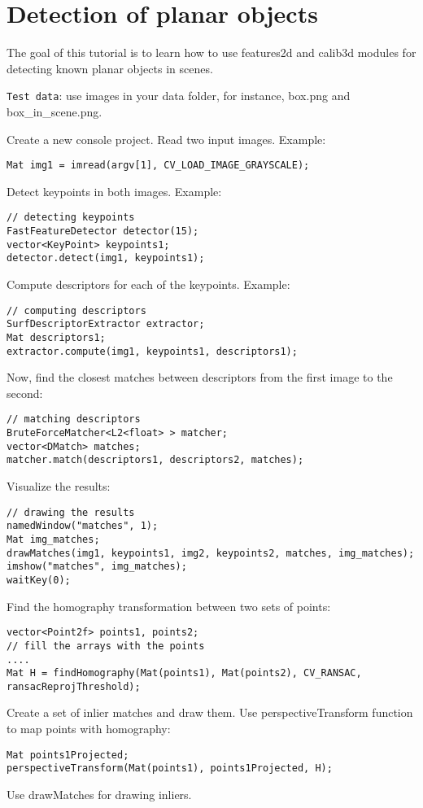 

\ifCpp
\section{Detection of planar objects}
The goal of this tutorial is to learn how to use features2d and calib3d modules for detecting known planar objects in scenes. 

\texttt{Test data}: use images in your data folder, for instance, box.png and box\_in\_scene.png. 

Create a new console project. Read two input images. Example:
\begin{lstlisting}
Mat img1 = imread(argv[1], CV_LOAD_IMAGE_GRAYSCALE);
\end{lstlisting}

Detect keypoints in both images. Example:
\begin{lstlisting}
// detecting keypoints
FastFeatureDetector detector(15);
vector<KeyPoint> keypoints1;
detector.detect(img1, keypoints1);
\end{lstlisting}

Compute descriptors for each of the keypoints. Example:
\begin{lstlisting}
// computing descriptors
SurfDescriptorExtractor extractor;
Mat descriptors1;
extractor.compute(img1, keypoints1, descriptors1);
\end{lstlisting}

Now, find the closest matches between descriptors from the first image to the second:
\begin{lstlisting}
// matching descriptors
BruteForceMatcher<L2<float> > matcher;
vector<DMatch> matches;
matcher.match(descriptors1, descriptors2, matches);
\end{lstlisting}

Visualize the results:
\begin{lstlisting}
// drawing the results
namedWindow("matches", 1);
Mat img_matches;
drawMatches(img1, keypoints1, img2, keypoints2, matches, img_matches);
imshow("matches", img_matches);
waitKey(0);
\end{lstlisting}

Find the homography transformation between two sets of points:
\begin{lstlisting}
vector<Point2f> points1, points2;
// fill the arrays with the points
....
Mat H = findHomography(Mat(points1), Mat(points2), CV_RANSAC, ransacReprojThreshold);
\end{lstlisting}

Create a set of inlier matches and draw them. Use perspectiveTransform function to map points with homography:
\begin{lstlisting}
Mat points1Projected;
perspectiveTransform(Mat(points1), points1Projected, H);
\end{lstlisting}
Use drawMatches for drawing inliers. 
\fi